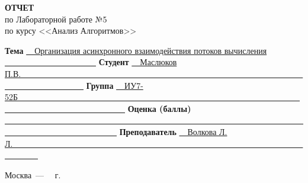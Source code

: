 \begin{titlepage}
\begin{center}
	\textbf{\large ОТЧЕТ} \\
	\large по Лабораторной работе №5\\
	по курсу <<Анализ Алгоритмов>>
\end{center}

	
	\noindent\textbf{Тема} \underline{~~Организация асинхронного взаимодействия потоков вычисления  ~~~~~~~~~~~~~~~~~~~~~~}\newline\newline
	\noindent\textbf{Студент} \underline{~~Маслюков П.В.~~~~~~~~~~~~~~~~~~~~~~~~~~~~~~~~~~~~~~~~~~~~~~~~~~~~~~~~~~~~~~~~~~~~~~~~~~~~~~~~~~~~~~~}\newline\newline
	\noindent\textbf{Группа} \underline{~~ИУ7-52Б~~~~~~~~~~~~~~~~~~~~~~~~~~~~~~~~~~~~~~~~~~~~~~~~~~~~~~~~~~~~~~~~~~~~~~~~~~~~~~~~~~~~~~~~~~~~~~~~~}\newline\newline
	\noindent\textbf{Оценка (баллы)} \underline{~~~~~~~~~~~~~~~~~~~~~~~~~~~~~~~~~~~~~~~~~~~~~~~~~~~~~~~~~~~~~~~~~~~~~~~~~~~~~~~~~~~~~~~~~~~~~~~~~~~}\newline\newline
	\noindent\textbf{Преподаватель} \underline{~~Волкова Л. Л.~~~~~~~~~~~~~~~~~~~~~~~~~~~~~~~~~~~~~~~~~~~~~~~~~~~~~~~~~~~~~~~~~~~~~~~~~~~~~~}\newline
	
	\begin{center}
		\vfill
		Москва~---~\the\year
		~г.
	\end{center}
 
    \restoregeometry
    
\end{titlepage}
